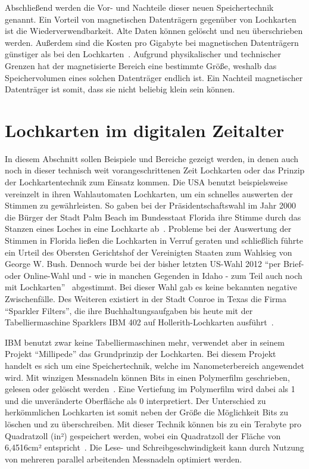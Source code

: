 \documentclass[parskip=half]{scrartcl}
\begin{document}
Abschließend werden die Vor- und Nachteile dieser neuen Speichertechnik
genannt. Ein Vorteil von magnetischen Datenträgern gegenüber von Lochkarten ist
die Wiederverwendbarkeit. Alte Daten können gelöscht und neu überschrieben
werden. Außerdem sind die Kosten pro Gigabyte bei magnetischen Datenträgern
günstiger als bei den Lochkarten~\cite{Dee}. Aufgrund physikalischer und
technischer Grenzen hat der magnetisierte Bereich eine bestimmte Größe, weshalb
das Speichervolumen eines solchen Datenträger endlich ist. Ein Nachteil
magnetischer Datenträger ist somit, dass sie nicht beliebig klein sein können.

\section{Lochkarten im digitalen Zeitalter}

In diesem Abschnitt sollen Beispiele und Bereiche gezeigt werden, in denen auch
noch in dieser technisch weit vorangeschrittenen Zeit Lochkarten oder das
Prinzip der Lochkartentechnik zum Einsatz kommen. Die USA benutzt
beispielsweise vereinzelt in ihren Wahlautomaten Lochkarten, um ein schnelles
auswerten der Stimmen zu gewährleisten. So gaben bei der Präsidentschaftswahl
im Jahr 2000 die Bürger der Stadt Palm Beach im Bundesstaat Florida ihre Stimme
durch das Stanzen eines Loches in eine Lochkarte ab~\cite{simons}. Probleme bei der Auswertung der Stimmen in Florida ließen die Lochkarten
in Verruf geraten und schließlich führte ein Urteil des Obersten Gerichtshof
der Vereinigten Staaten zum Wahlsieg von George W. Bush. Dennoch wurde bei der
bisher letzten US-Wahl 2012 \enquote{per Brief- oder Online-Wahl und - wie in
manchen Gegenden in Idaho - zum Teil auch noch mit Lochkarten}~\cite{keinVerfasser}
abgestimmt.  Bei dieser Wahl gab es keine bekannten negative Zwischenfälle. Des
Weiteren existiert in der Stadt Conroe in Texas die Firma \enquote{Sparkler
Filters}, die ihre Buchhaltungsaufgaben bis heute mit der Tabelliermaschine
Sparklers IBM 402 auf Hollerith-Lochkarten ausführt~\cite{edwards}.

IBM benutzt zwar keine Tabelliermaschinen mehr, verwendet aber in seinem
Projekt \enquote{Millipede} das Grundprinzip der Lochkarten. Bei diesem Projekt
handelt es sich um eine Speichertechnik, welche im Nanometerbereich angewendet
wird.  Mit winzigen Messnadeln können Bits in einen Polymerfilm geschrieben,
gelesen oder gelöscht werden~\cite{binnig}. Eine Vertiefung im
Polymerfilm wird dabei als 1 und die unveränderte Oberfläche als 0
interpretiert. Der Unterschied zu herkömmlichen Lochkarten ist somit neben der
Größe die Möglichkeit Bits zu löschen und zu überschreiben. Mit dieser Technik
können bis zu ein Terabyte pro Quadratzoll (in²) gespeichert werden, wobei ein
Quadratzoll der Fläche von 6,4516cm² entspricht~\cite{binnig}. Die
Lese- und Schreibgeschwindigkeit kann durch Nutzung von mehreren parallel
arbeitenden Messnadeln optimiert werden.
\end{document}
